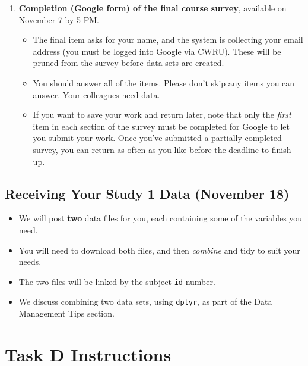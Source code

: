 \documentclass[]{book}
\providecommand{\tightlist}{%
  \setlength{\itemsep}{0pt}\setlength{\parskip}{0pt}}
\theoremstyle{definition}
\theoremstyle{definition}
\theoremstyle{definition}
\theoremstyle{remark}
\begin{document}
\begin{enumerate}
\def\labelenumi{\arabic{enumi}.}
\setcounter{enumi}{1}
\tightlist
\item
  \textbf{Completion (Google form) of the final course survey},
  available on November 7 by 5 PM.

  \begin{itemize}
  \tightlist
  \item
    The final item asks for your name, and the system is collecting your
    email address (you must be logged into Google via CWRU). These will
    be pruned from the survey before data sets are created.
  \item
    You should answer all of the items. Please don't skip any items you
    can answer. Your colleagues need data.
  \item
    If you want to save your work and return later, note that only the
    \emph{first} item in each section of the survey must be completed
    for Google to let you submit your work. Once you've submitted a
    partially completed survey, you can return as often as you like
    before the deadline to finish up.
  \end{itemize}
\end{enumerate}

\hypertarget{receiving-your-study-1-data-november-18}{%
\section{Receiving Your Study 1 Data (November
18)}\label{receiving-your-study-1-data-november-18}}

\begin{itemize}
\tightlist
\item
  We will post \textbf{two} data files for you, each containing some of
  the variables you need.
\item
  You will need to download both files, and then \emph{combine} and tidy
  to suit your needs.
\item
  The two files will be linked by the subject \texttt{id} number.
\item
  We discuss combining two data sets, using \texttt{dplyr}, as part of
  the Data Management Tips section.
\end{itemize}

\hypertarget{task-d-instructions}{%
\chapter{Task D Instructions}\label{task-d-instructions}}
\end{document}
